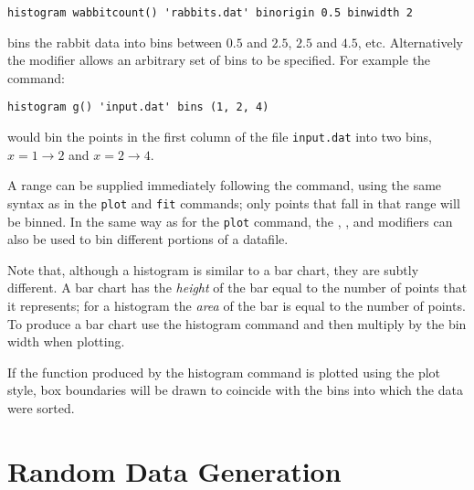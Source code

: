 \begin{verbatim}
histogram wabbitcount() 'rabbits.dat' binorigin 0.5 binwidth 2
\end{verbatim}

\noindent bins the rabbit data into bins between $0.5$ and $2.5$, $2.5$ and
$4.5$, etc.  Alternatively the  modifier allows an arbitrary set
of bins to be specified. For example the command:

\begin{verbatim}
histogram g() 'input.dat' bins (1, 2, 4)
\end{verbatim}

\noindent would bin the points in the first column of the file {\tt input.dat}
into two bins, $x=1\to 2$ and $x=2\to 4$.

A range can be supplied immediately following the command, using the same
syntax as in the {\tt plot} and {\tt fit} commands; only points that fall in
that range will be binned.  In the same way as for the {\tt plot} command,
the , ,  and 
modifiers can also be used to bin different portions of a datafile.

Note that, although a histogram is similar to a bar chart, they are subtly
different.  A bar chart has the {\it height} of the bar equal to the number of
points that it represents; for a histogram the {\it area} of the bar is equal to
the number of points.  To produce a bar chart use the histogram
command and then multiply by the bin width when plotting.

If the function produced by the histogram command is plotted using the
 plot style, box boundaries will be drawn to coincide with the
bins into which the data were sorted.

\section{Random Data Generation}

